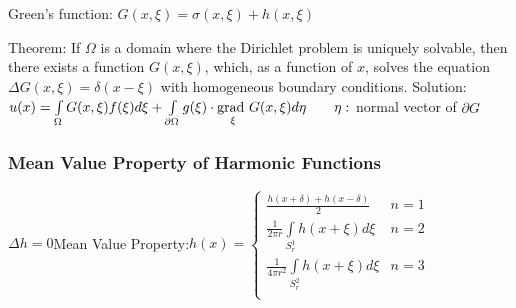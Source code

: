 Green's function: $G(x,\xi)=\sigma(x,\xi)+h(x,\xi)$

Theorem: If $\Omega$ is a domain where the Dirichlet problem is uniquely solvable, then there exists a function $G(x,\xi)$, which, as a function of $x$, solves the equation
$\Delta G(x,\xi)=\delta(x-\xi)$
with homogeneous boundary conditions.
Solution: $u(x)=\int\limits_{\Omega}^{}{G(x,\xi)f(\xi)d\xi}+\int\limits_{\partial\Omega}g(\xi)\cdot\underset{\xi}{\mathrm{grad~}}G(x,\xi)d\eta\qquad \eta:$ normal vector of $\partial G$

\subsubsection{Mean Value Property of Harmonic Functions}

$\Delta h=0$\qquad Mean Value Property:\qquad $h(x)=
\begin{cases}
	\frac{h(x+\delta)+h(x-\delta)}{2}& n=1 \\
	\frac 1{2\pi r} \int\limits_{S_r^1}{h(x+\xi)d\xi} & n=2\\
	\frac 1{4\pi r^2} \int\limits_{S_r^2}{h(x+\xi)d\xi} & n=3\\
\end{cases}$

